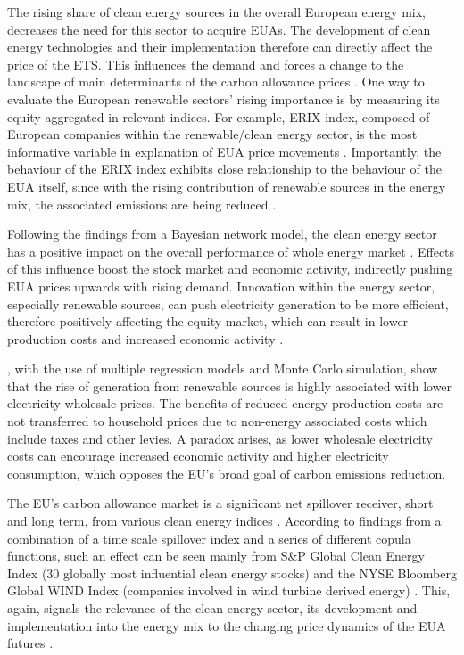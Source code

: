 \documentclass[12pt, letterpaper]{article}
\begin{document}
The rising share of clean energy sources in the overall European energy mix, decreases the need for this sector to acquire EUAs. The development of clean energy technologies and their implementation therefore can directly affect the price of the ETS. This influences the demand and forces a change to the landscape of main determinants of the carbon allowance prices \parencite{salvagnin2024}. One way to evaluate the European renewable sectors’ rising importance is by measuring its equity aggregated in relevant indices. For example, ERIX index, composed of European companies within the renewable/clean energy sector, is the most informative variable in explanation of EUA price movements \parencite{salvagnin2024}. Importantly, the behaviour of the ERIX index exhibits close relationship to the behaviour of the EUA itself, since with the rising contribution of renewable sources in the energy mix, the associated emissions are being reduced \parencite{hailemariam2022, salvagnin2024}.

Following the findings from a Bayesian network model, the clean energy sector has a positive impact on the overall performance of whole energy market \parencite{wang2020}. Effects of this influence boost the stock market and economic activity, indirectly pushing EUA prices upwards with rising demand. Innovation within the energy sector, especially renewable sources, can push electricity generation to be more efficient, therefore positively affecting the equity market, which can result in lower production costs and increased economic activity \parencite{wang2020}.

\textcite{pena2022}, with the use of multiple regression models and Monte Carlo simulation, show that the rise of generation from renewable sources is highly associated with lower electricity wholesale prices. The benefits of reduced energy production costs are not transferred to household prices due to non-energy associated costs which include taxes and other levies. A paradox arises, as lower wholesale electricity costs can encourage increased economic activity and higher electricity consumption, which opposes the EU’s broad goal of carbon emissions reduction.

The EU’s carbon allowance market is a significant net spillover receiver, short and long term, from various clean energy indices \parencite{hanif2021}. According to findings from a combination of a time scale spillover index and a series of different copula functions, such an effect can be seen mainly from S\&P Global Clean Energy Index (30 globally most influential clean energy stocks) and the NYSE Bloomberg Global WIND Index (companies involved in wind turbine derived energy) \parencite{hanif2021}. This, again, signals the relevance of the clean energy sector, its development and implementation into the energy mix to the changing price dynamics of the EUA futures \parencite{hanif2021}. 
\end{document}
